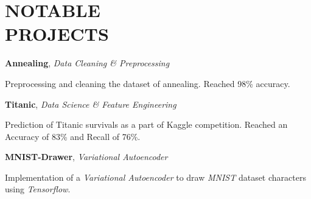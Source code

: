 \documentclass[margin, 10pt]{res} %
\begin{document}
\section{NOTABLE \\ PROJECTS}

\textbf{Annealing}, 
\textit{Data Cleaning \& Preprocessing}
\begin{innerlist}
	\item Preprocessing and cleaning the dataset of annealing. Reached 98\% accuracy. \href{https://github.com/aligholamee/Datadigger/assignment-2/src}{\UrlFont[code]}\href{https://github.com/aligholamee/Datadigger/assignment-2/docs}{\UrlFont[report]}
\end{innerlist}

\textbf{Titanic}, 
\textit{Data Science \& Feature Engineering}
\begin{innerlist}
	\item Prediction of Titanic survivals as a part of Kaggle competition. Reached an Accuracy of 83\% and Recall of 76\%. \href{https://github.com/aligholamee/Titanic}{\UrlFont[notebook]}
\end{innerlist}

\textbf{MNIST-Drawer}, 
\textit{Variational Autoencoder}
\begin{innerlist}
	\item Implementation of a \textit{Variational Autoencoder} to draw \textit{MNIST} dataset characters using \textit{Tensorflow}. \href{https://github.com/aligholamee/MNIST-Drawer}{\UrlFont[code]}
\end{innerlist}
\end{document}
